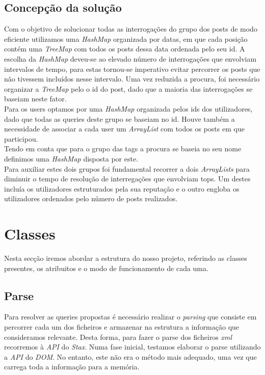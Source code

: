 \documentclass[10pt,a4paper]{article}
\begin{document}
\subsection{Concepção da solução}
 Com o objetivo de solucionar todas as interrogações do grupo dos posts de modo eficiente utilizamos uma \textit{HashMap} organizada por datas, em que cada posição contém uma \textit{TreeMap} com todos os posts dessa data ordenada pelo seu id. A escolha da \textit{HashMap} deveu-se ao elevado número de interrogações que envolviam intervalos de tempo, para estas tornou-se imperativo evitar percorrer os posts que não tivessem incluídos nesse intervalo. Uma vez reduzida a procura, foi necessário organizar a \textit{TreeMap} pelo o id do post, dado que a maioria das interrogações se baseiam neste fator.\\
 \indent Para os users optamos por uma \textit{HashMap} organizada pelos ids dos utilizadores, dado que todas as queries deste grupo se baseiam no id. Houve também a necessidade de associar a cada user um \textit{ArrayList} com todos os posts em que participou.\\
 \indent Tendo em conta que para o grupo das tags a procura se baseia no seu nome definimos uma \textit{HashMap} disposta por este. \\
\indent Para auxiliar estes dois grupos foi fundamental recorrer a dois \textit{ArrayLists} para diminuir o tempo de resolução de interregações que envolviam tops. Um destes incluía os utilizadores estruturados pela sua reputação e o outro engloba os utilizadores ordenados pelo número de posts realizados.
\cleardoublepage
\section{Classes}
\label{sec:solucao}
Nesta secção iremos abordar a estrutura do nosso projeto, referindo as classes presentes, os
atribuitos e o modo de funcionamento de cada uma.

\subsection{Parse}
Para resolver as queries propostas é necessário realizar o \textit{parsing} que consiste em percorrer cada um dos ficheiros e armazenar na estrutura a informação que consideramos relevante.
Desta forma, para fazer o parse dos ficheiros \textit{xml} recorremos à \textit{API} do \textit{Stax}. 
Numa fase inicial, testamos elaborar o parse utilizando a \textit{API} do \textit{DOM}. No entanto, este não era o método mais adequado, uma vez que carrega toda a informação para a memória.
\end{document}
